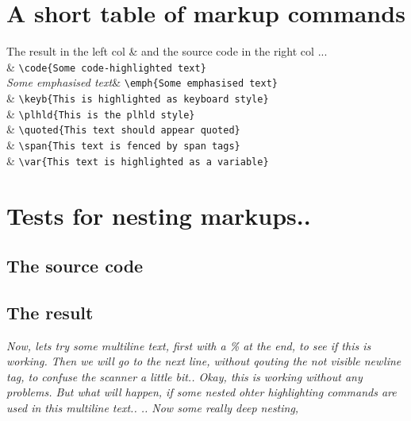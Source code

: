 \documentclass{generic}
\begin{document}
\section{A short table of markup commands}


\begin{table}
\head
The result in the left col & and the source code in the right col ...\\
\body
{} & \verb/\code{Some code-highlighted text}/  \\

\emph{Some emphasised text}& \verb/\emph{Some emphasised text}/  \\

& \verb/\keyb{This is highlighted as keyboard style}/  \\

& \verb/\plhld{This is the plhld style}/  \\

& \verb/\quoted{This text should appear quoted}/  \\

& \verb/\span{This text is fenced by span tags}/  \\

& \verb/\var{This text is highlighted as a variable}/ 
\end{table}



\section{Tests for nesting markups..}
\subsection{The source code}

\subsection{The result}

\emph{Now, lets try some multiline text, first with a \% at the end, to see if this is %
  working. Then we will go to the next line, without qouting the not visible newline tag, to
  confuse the scanner a little bit..
  Okay, this is working without any problems. But what will happen, if some nested ohter
  highlighting commands are used in this multiline text.. ..
Now some really deep nesting, 
  }
\end{document}
